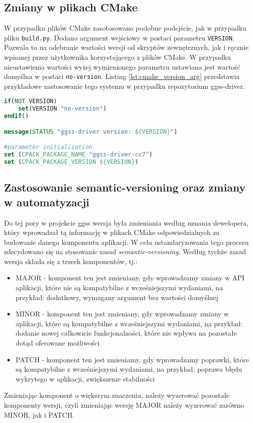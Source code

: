 \subsection{Zmiany w plikach CMake}

W przypadku plików CMake zasotosowano podobne podejście, jak w przypadku pliku \lstinline{build.py}. Dodano argument wejściowy w postaci parametru \lstinline{VERSION}. Pozwala to na odebranie wartości wersji od skryptów zewnętrznych, jak i ręcznie wpisanej przez użytkownika korzystającego z plików CMake. W przypadku nieustawienia wartości wyżej wymienionego parametru ustawiana jest wartość domyślna w postaci \lstinline{no-version}. Listing \ref{lst:cmake_version_arg} przedstawia przykładowe zastosowanie tego systemu w przypadku repozytorium ggss-driver.

\begin{lstlisting}[language=CMake,caption={Zastosowanie parametru VERSION w repozytorium ggss-driver},label={lst:cmake_version_arg},frame=single]
if(NOT VERSION)
    set(VERSION "no-version")
endif()

message(STATUS "ggss-driver version: ${VERSION}")

#parameter initialization
set (CPACK_PACKAGE_NAME "ggss-driver-cc7")
set (CPACK_PACKAGE_VERSION ${VERSION})
\end{lstlisting}


\subsection{Zastosowanie semantic-versioning oraz zmiany w automatyzacji}

Do tej pory w projekcie ggss wersja była zmieniania według uznania dewelopera, który wprowadzał tą informację w plikach CMake odpowiedzialnych za budowanie danego komponentu aplikacji. W celu ustandaryzowania tego procesu zdecydowano się na stosowanie zasad \emph{semantic-versioning}. Według tychże zasad wersja składa się z trzech komponentów, tj.:
\begin{itemize}
    \item MAJOR - komponent ten jest zmieniany, gdy wprowadzamy zmiany w API aplikacji, które nie są kompatybilne z wcześniejszymi wydaniami, na przykład: dodatkowy, wymagany argument bez wartości domyślnej
    \item MINOR - komponent ten jest zmieniany, gdy wprowadzamy zmiany w aplikacji, które są kompatybilne z wcześniejszymi wydaniami, na przykład: dodanie nowej całkowicie funkcjonalności, które nie wpływa na pozostałe dotąd oferowane możliwości
    \item PATCH - komponent ten jest zmieniamy, gdy wprowadzamy poprawki, które są kompatybilne z wcześniejszymi wydaniami, na przykład: poprawa błędu wykrytego w aplikacji, zwiększenie stabilności
\end{itemize}
Zmieniając komponent o większym znaczeniu, należy wyzerować pozostałe komponenty wersji, czyli zmieniając wersję MAJOR należy wyzerować zarówno MINOR, jak i PATCH.

